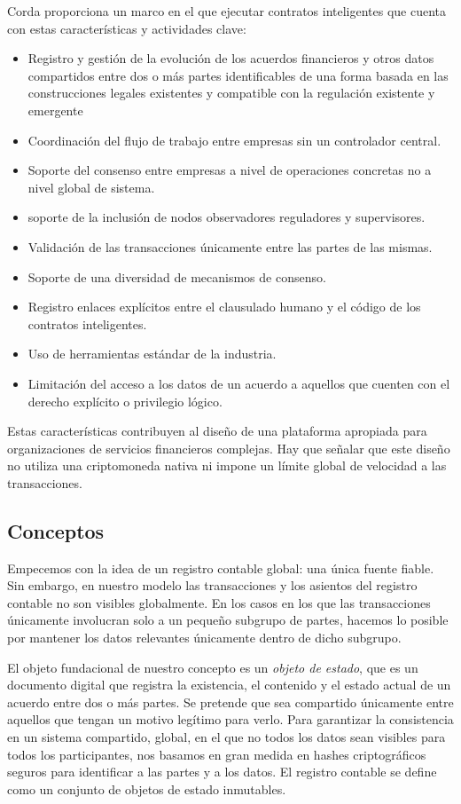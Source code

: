 \documentclass{article}
\begin{document}
Corda proporciona un marco en el que ejecutar contratos inteligentes que cuenta con estas características y actividades clave:
\begin{itemize}
    \item{Registro y gestión de la evolución de los acuerdos financieros y otros datos compartidos entre dos o más partes identificables de una forma basada en las construcciones legales existentes y compatible con la regulación existente y emergente}
    \item{Coordinación del flujo de trabajo entre empresas sin un controlador central.}
    \item{Soporte del consenso entre empresas a nivel de operaciones concretas no a nivel global de sistema.}
    \item{soporte de la inclusión de nodos observadores reguladores y supervisores.}
    \item{Validación de las transacciones únicamente entre las partes de las mismas.}
    \item{Soporte de una diversidad de mecanismos de consenso.}
    \item{Registro enlaces explícitos entre el clausulado humano y el código de los contratos inteligentes.}
    \item{Uso de herramientas estándar de la industria.}
    \item{Limitación del acceso a los datos de un acuerdo a aquellos que cuenten con el derecho explícito o privilegio lógico.}
\end{itemize}
Estas características contribuyen al diseño de una plataforma apropiada para organizaciones de servicios financieros complejas. Hay que señalar que este diseño no utiliza una criptomoneda nativa ni impone un límite global de velocidad a las transacciones.

\subsection{Conceptos}
Empecemos con la idea de un registro contable global: una única fuente fiable. Sin embargo, en nuestro modelo las transacciones y los asientos del registro contable no son visibles globalmente. En los casos en los que las transacciones únicamente involucran solo a un pequeño subgrupo de partes, hacemos lo posible por mantener los datos relevantes únicamente dentro de dicho subgrupo. 

El objeto fundacional de nuestro concepto es un \textit{objeto de estado}, que es un documento digital que registra la existencia, el contenido y el estado actual de un acuerdo entre dos o más partes. Se pretende que sea compartido únicamente entre aquellos que tengan un motivo legítimo para verlo. Para garantizar la consistencia en un sistema compartido, global, en el que no todos los datos sean visibles para todos los participantes, nos basamos en gran medida en hashes criptográficos seguros para identificar a las partes y a los datos. El registro contable se define como un conjunto de objetos de estado inmutables.
\end{document}
